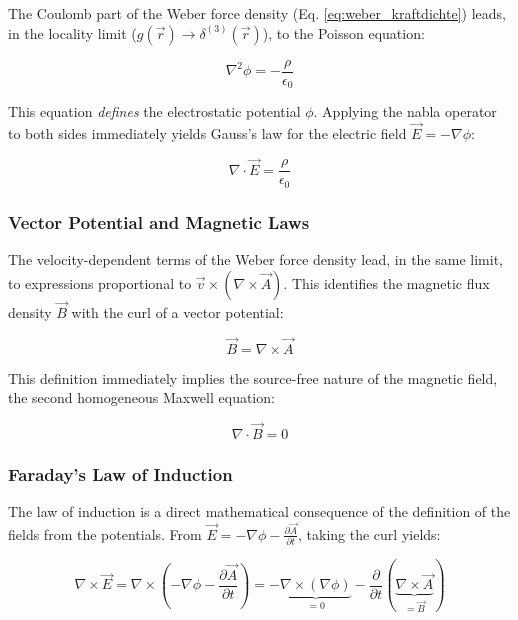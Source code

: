 The Coulomb part of the Weber force density (Eq. \ref{eq:weber_kraftdichte}) leads, in the locality limit ($g(\vec{r}) \rightarrow \delta^{(3)}(\vec{r})$), to the Poisson equation:

\begin{equation}
    \nabla^2 \phi = -\frac{\rho}{\epsilon_0}
\end{equation}

This equation \textit{defines} the electrostatic potential $\phi$. Applying the nabla operator to both sides immediately yields Gauss's law for the electric field $\vec{E} = -\nabla \phi$:

\begin{equation}
    \nabla \cdot \vec{E} = \frac{\rho}{\epsilon_0}
\end{equation}

\subsubsection{Vector Potential and Magnetic Laws}

The velocity-dependent terms of the Weber force density lead, in the same limit, to expressions proportional to $\vec{v} \times (\nabla \times \vec{A})$. This identifies the magnetic flux density $\vec{B}$ with the curl of a vector potential:

\begin{equation}
    \vec{B} = \nabla \times \vec{A}
\end{equation}

This definition immediately implies the source-free nature of the magnetic field, the second homogeneous Maxwell equation:

\begin{equation}
    \nabla \cdot \vec{B} = 0
\end{equation}

\subsubsection{Faraday's Law of Induction}

The law of induction is a direct mathematical consequence of the definition of the fields from the potentials. From $\vec{E} = -\nabla \phi - \frac{\partial \vec{A}}{\partial t}$, taking the curl yields:

\begin{equation}
    \nabla \times \vec{E} = \nabla \times (-\nabla \phi - \frac{\partial \vec{A}}{\partial t}) = - \underbrace{\nabla \times (\nabla \phi)}_{=0} - \frac{\partial}{\partial t} (\underbrace{\nabla \times \vec{A}}_{=\vec{B}})
\end{equation}

